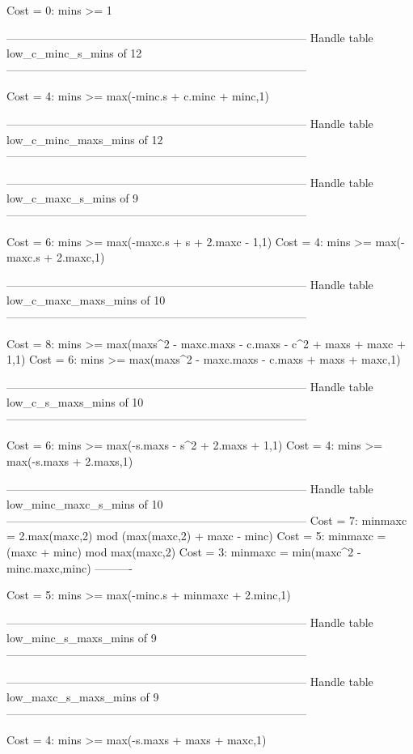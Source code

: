 Cost =  0:  mins >= 1

--------------------------------------------------------------------------------
Handle table low_c_minc_s_mins of 12
--------------------------------------------------------------------------------

Cost =  4:  mins >= max(-minc.s + c.minc + minc,1)

--------------------------------------------------------------------------------
Handle table low_c_minc_maxs_mins of 12
--------------------------------------------------------------------------------


--------------------------------------------------------------------------------
Handle table low_c_maxc_s_mins of 9
--------------------------------------------------------------------------------

Cost =  6:  mins >= max(-maxc.s + s + 2.maxc - 1,1)
Cost =  4:  mins >= max(-maxc.s + 2.maxc,1)

--------------------------------------------------------------------------------
Handle table low_c_maxc_maxs_mins of 10
--------------------------------------------------------------------------------

Cost =  8:  mins >= max(maxs^2 - maxc.maxs - c.maxs - c^2 + maxs + maxc + 1,1)
Cost =  6:  mins >= max(maxs^2 - maxc.maxs - c.maxs + maxs + maxc,1)

--------------------------------------------------------------------------------
Handle table low_c_s_maxs_mins of 10
--------------------------------------------------------------------------------

Cost =  6:  mins >= max(-s.maxs - s^2 + 2.maxs + 1,1)
Cost =  4:  mins >= max(-s.maxs + 2.maxs,1)

--------------------------------------------------------------------------------
Handle table low_minc_maxc_s_mins of 10
--------------------------------------------------------------------------------
Cost =  7:  minmaxc = 2.max(maxc,2) mod (max(maxc,2) + maxc - minc)
Cost =  5:  minmaxc = (maxc + minc) mod max(maxc,2)
Cost =  3:  minmaxc = min(maxc^2 - minc.maxc,minc)
----------

Cost =  5:  mins >= max(-minc.s + minmaxc + 2.minc,1)

--------------------------------------------------------------------------------
Handle table low_minc_s_maxs_mins of 9
--------------------------------------------------------------------------------


--------------------------------------------------------------------------------
Handle table low_maxc_s_maxs_mins of 9
--------------------------------------------------------------------------------

Cost =  4:  mins >= max(-s.maxs + maxs + maxc,1)

